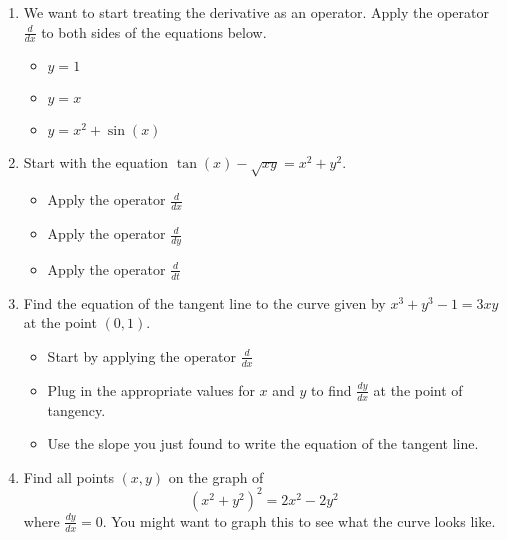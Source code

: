 \documentclass{article}
\begin{document}
\begin{enumerate}
\item We want to start treating the derivative as an operator. Apply the operator $\frac{d}{dx}$ to both sides of the equations below. 
\begin{itemize}
    \item $y = 1$
    \item $y = x$
    \item $y = x^2 + \sin(x)$
\end{itemize}

\item Start with the equation $\tan(x) - \sqrt{xy} = x^2 + y^2$.
\begin{itemize}
\item Apply the operator $\frac{d}{dx}$
\item Apply the operator $\frac{d}{dy}$
\item Apply the operator $\frac{d}{dt}$
\end{itemize}
\item Find the equation of the tangent line to the curve given by $x^3 + y^3 - 1 = 3xy$ at the point $(0,1)$.
\begin{itemize}
    \item Start by applying the operator $\frac{d}{dx}$
    \item Plug in the appropriate values for $x$ and $y$ to find $\frac{dy}{dx}$ at the point of tangency.
    \item Use the slope you just found to write the equation of the tangent line.
\end{itemize}
\item Find all points $(x, y)$ on the graph of $$(x^2+y^2)^2 = 2x^2-2y^2$$  where $\frac{dy}{dx} = 0$. You might want to graph this to see what the curve looks like.

\end{enumerate}
\end{document}
